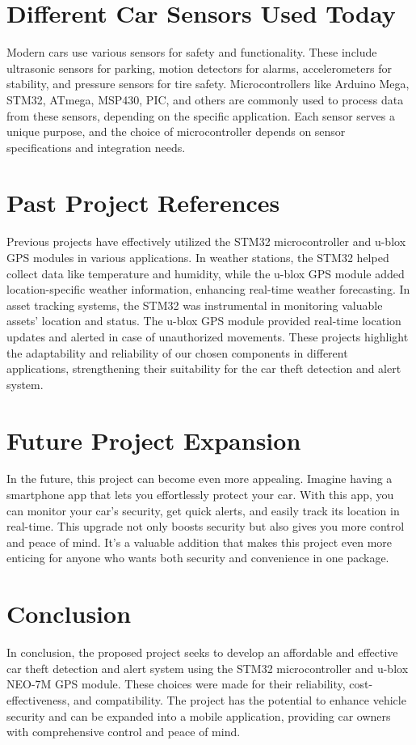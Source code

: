 \documentclass[conference]{IEEEtran}
\begin{document}
\section{Different Car Sensors Used Today}
Modern cars use various sensors for safety and functionality. These include ultrasonic sensors
for parking, motion detectors for alarms, accelerometers for stability, and pressure sensors for
tire safety. Microcontrollers like Arduino Mega, STM32, ATmega, MSP430, PIC, and others are
commonly used to process data from these sensors, depending on the specific application. Each
sensor serves a unique purpose, and the choice of microcontroller depends on sensor specifications and integration needs.

\section{Past Project References}
Previous projects have effectively utilized the STM32 microcontroller and u-blox GPS modules in
various applications. In weather stations, the STM32 helped collect data like temperature and
humidity, while the u-blox GPS module added location-specific weather information, enhancing
real-time weather forecasting.
In asset tracking systems, the STM32 was instrumental in monitoring valuable assets' location
and status. The u-blox GPS module provided real-time location updates and alerted in case of
unauthorized movements. These projects highlight the adaptability and reliability of our chosen
components in different applications, strengthening their suitability for the car theft detection
and alert system.

\section{Future Project Expansion}
In the future, this project can become even more appealing. Imagine having a smartphone app
that lets you effortlessly protect your car. With this app, you can monitor your car's security, get
quick alerts, and easily track its location in real-time. This upgrade not only boosts security but
also gives you more control and peace of mind. It's a valuable addition that makes this project
even more enticing for anyone who wants both security and convenience in one package.

\section{Conclusion}
In conclusion, the proposed project seeks to develop an affordable and effective car theft
detection and alert system using the STM32 microcontroller and u-blox NEO-7M GPS module.
These choices were made for their reliability, cost-effectiveness, and compatibility. The project
has the potential to enhance vehicle security and can be expanded into a mobile application,
providing car owners with comprehensive control and peace of mind.
\end{document}
